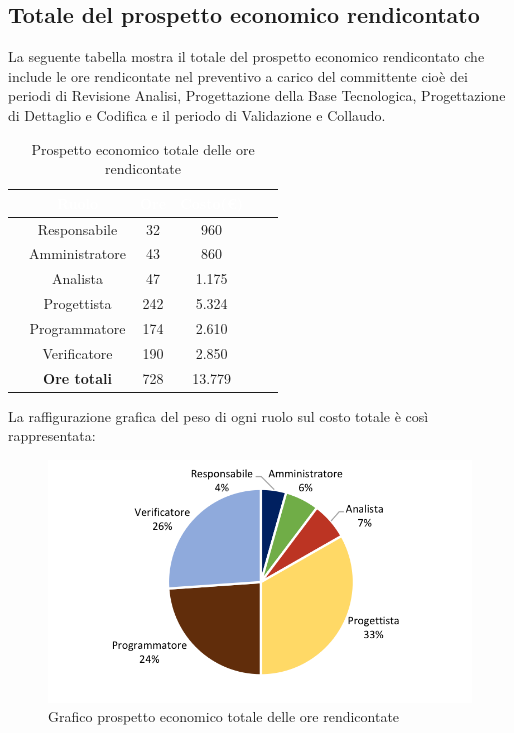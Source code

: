 \subsection{Totale del prospetto economico rendicontato}
La seguente tabella mostra il totale del prospetto economico rendicontato che  include le ore rendicontate nel preventivo a carico del committente cioè dei periodi di Revisione Analisi, Progettazione della Base Tecnologica, Progettazione di Dettaglio e Codifica e il periodo di Validazione e Collaudo.

\begin{table}[ht]
	\begin{center}
		\begin{tabular}{cccccc}
			\rowcolor{coolblack}
			\hline
			&\textcolor{white}{Ruolo}&	\textcolor{white}{Ore} &\textcolor{white}{Costo(\euro)} \\
			\hline
			&Responsabile           &32&960\\
			&Amministratore        & 43& 860 \\
			&Analista                   & 47& 1.175\\
			&Progettista              &  242& 5.324\\
			&Programmatore       & 174& 2.610 \\
			&Verificatore             & 190& 2.850\\
			\hline
			&\textbf{Ore totali}    &728&13.779\\
		\end{tabular}
		\caption{Prospetto economico totale delle ore rendicontate}
	\end{center}
\end{table}

La raffigurazione grafica del peso di ogni ruolo sul costo totale è così rappresentata:

\begin{figure}[!ht]
	\begin{center}
		\includegraphics[scale=0.90]{images/grafoOreRendicontateEuro.png}
		\caption{Grafico prospetto economico totale delle ore rendicontate}
	\end{center}
\end{figure}

